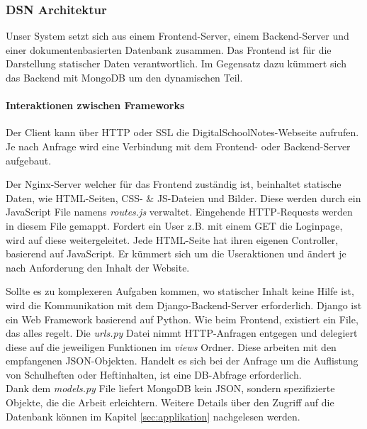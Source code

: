 \newpage

\subsubsection{DSN Architektur}
Unser System setzt sich aus einem Frontend-Server, einem Backend-Server und einer dokumentenbasierten Datenbank zusammen. Das Frontend ist für die Darstellung statischer Daten verantwortlich. Im Gegensatz dazu kümmert sich das Backend mit MongoDB um den dynamischen Teil.
\paragraph{Interaktionen zwischen Frameworks}

Der Client kann über HTTP oder SSL die DigitalSchoolNotes-Webseite aufrufen. Je nach Anfrage wird eine Verbindung mit dem Frontend- oder Backend-Server aufgebaut.

Der Nginx-Server welcher für das Frontend zuständig ist, beinhaltet statische Daten, wie HTML-Seiten, CSS- \& JS-Dateien und Bilder. Diese werden durch ein JavaScript File namens \textit{routes.js} verwaltet. Eingehende HTTP-Requests werden in diesem File gemappt. Fordert ein User z.B. mit einem GET die Loginpage, wird auf diese weitergeleitet. Jede HTML-Seite hat ihren eigenen Controller, basierend auf JavaScript. Er kümmert sich um die Useraktionen und ändert je nach Anforderung den Inhalt der Website.


Sollte es zu komplexeren Aufgaben kommen, wo statischer Inhalt keine Hilfe ist, wird die Kommunikation mit dem Django-Backend-Server erforderlich. Django ist ein Web Framework basierend auf Python. Wie beim Frontend, existiert ein File, das alles regelt. Die \textit{urls.py} Datei nimmt HTTP-Anfragen entgegen und delegiert diese auf die jeweiligen Funktionen im \textit{views} Ordner. Diese arbeiten mit den empfangenen JSON-Objekten. Handelt es sich bei der Anfrage um die Auflistung von Schulheften oder Heftinhalten, ist eine DB-Abfrage erforderlich.\\
Dank dem \textit{models.py} File liefert MongoDB kein JSON, sondern spezifizierte Objekte, die die Arbeit erleichtern. Weitere Details über den Zugriff auf die Datenbank können im Kapitel \ref{sec:applikation} nachgelesen werden.


